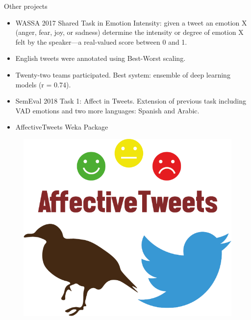 \documentclass[handout]{beamer}
\begin{document}
\begin{frame}{Other projects}
\begin{scriptsize}
\begin{itemize}
\item  WASSA 2017 Shared Task in Emotion Intensity: given a tweet an emotion X (anger, fear, joy, or sadness) determine the intensity or degree of emotion X felt by the speaker—a real-valued score between 0 and 1. 
\item English tweets were annotated using Best-Worst scaling.
\item Twenty-two teams participated.  Best system: ensemble of deep learning models (r = 0.74).
\item SemEval 2018 Task 1: Affect in Tweets. Extension of previous task including VAD emotions and two more languages: Spanish and Arabic.
\item AffectiveTweets Weka Package
\end{itemize}
\end{scriptsize}

\begin{figure}[h!]
	\centering
	\includegraphics[scale=0.2]{pics/affectiveTweetsLogo.png}
\end{figure}

\end{frame}
\end{document}
